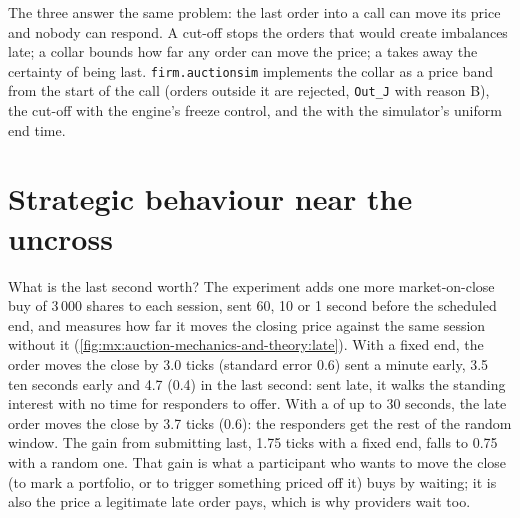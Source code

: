 The three answer the same problem: the last order into a call can move its price and nobody can respond. A cut-off stops the orders that would create
imbalances late; a collar bounds how far any order can move the price; a  takes away the certainty of being last. \texttt{firm.auctionsim}
implements the collar as a price band from the start of the call (orders outside it are rejected, \texttt{Out\_J} with reason B), the cut-off with the
engine's freeze control, and the  with the simulator's uniform end time.

\section{Strategic behaviour near the uncross}

What is the last second worth? The experiment adds one more market-on-close buy of 3\,000 shares to each session, sent 60, 10 or 1 second before the
scheduled end, and measures how far it moves the closing price against the same session without it (\cref{fig:mx:auction-mechanics-and-theory:late}).
With a fixed end, the order moves the close by 3.0 ticks (standard error 0.6) sent a minute early, 3.5 ten seconds early and 4.7 (0.4) in the last second:
sent late, it walks the standing interest with no time for responders to offer. With a  of up to 30 seconds, the late order moves the close by
3.7 ticks (0.6): the responders get the rest of the random window. The gain from submitting last, 1.75 ticks with a fixed end, falls to 0.75 with a random
one. That gain is what a participant who wants to move the close (to mark a portfolio, or to trigger something priced off it) buys by waiting; it is also
the price a legitimate late order pays, which is why providers wait too.

